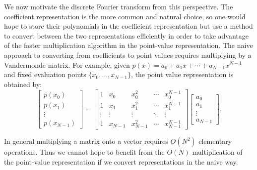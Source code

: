 \documentclass[prb,preprint]{revtex4}
\begin{document}
We now motivate the discrete Fourier transform from this perspective. The coefficient representation is the more common and natural choice, so one would hope to store their polynomials in the coefficient representation but use a method to convert between the two representations efficiently in order to take advantage of the faster multiplication algorithm in the point-value representation. The naive approach to converting from coefficients to point values requires multiplying by a Vandermonde matrix. For example, given $p(x) = a_0 + a_1 x + \cdots + a_{N-1}x^{N-1}$ and fixed evaluation points $\{x_0, \ldots, x_{N-1}\}$, the point value representation is obtained by:
\begin{equation}
\begin{bmatrix}
	p(x_0) \\
	p(x_1) \\
	\vdots \\
	p(x_{N-1})
\end{bmatrix}
=
\begin{bmatrix}
	1 & x_0 & x_0^2 & \cdots & x_0^{N-1} \\
	1 & x_1 & x_1^2 & \cdots & x_1^{N-1} \\
	\vdots & \vdots & \vdots & \ddots & \vdots \\
	1 & x_{N-1} & x_{N-1}^2 & \cdots & x_{N-1}^{N-1}
\end{bmatrix}
\begin{bmatrix}
	a_0 \\ a_1 \\ \vdots \\ a_{N-1}
\end{bmatrix}.
\end{equation}

In general multiplying a matrix onto a vector requires $O(N^2)$ elementary operations. Thus we cannot hope to benefit from the $O(N)$ multiplication of the point-value representation if we convert representations in the naive way.
\end{document}
